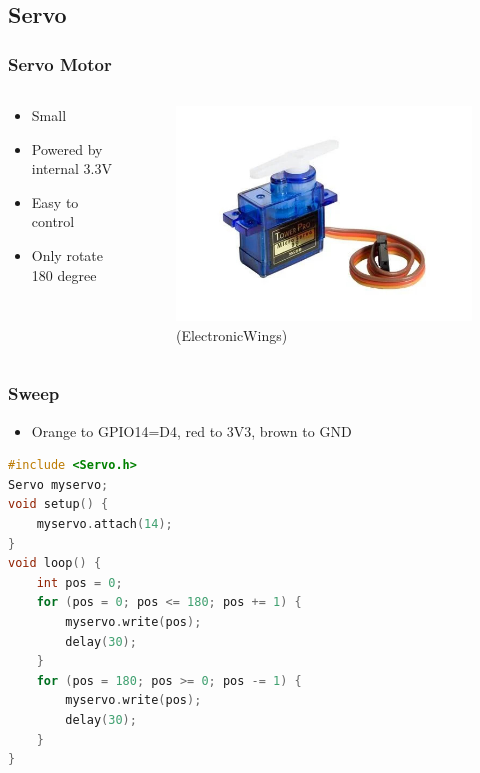 \documentclass[compress, aspectratio=32]{beamer}
\begin{document}
\subsection{Servo}
\begin{frame}
    \frametitle{Servo Motor}
    \begin{columns}
        \begin{column}[]{0.5\textwidth}
            \begin{itemize}
                \item Small
                \item Powered by internal 3.3V
                \item Easy to control
                \item Only rotate 180 degree
            \end{itemize}
        \end{column}
        \begin{column}[]{0.5\textwidth}
            \begin{figure}
                \centering
                \includegraphics[width=\textwidth]{servo.jpg}
                \caption*{(ElectronicWings)}
            \end{figure}
        \end{column}
    \end{columns}
\end{frame}
\begin{frame}[fragile]
    \frametitle{Sweep}
    \begin{itemize}
        \item Orange to GPIO14=D4, red to 3V3, brown to GND
    \end{itemize}
    \begin{lstlisting}[language=c]
#include <Servo.h>
Servo myservo;
void setup() {
    myservo.attach(14);
}
void loop() {
    int pos = 0;
    for (pos = 0; pos <= 180; pos += 1) {  
        myservo.write(pos);  
        delay(30);           
    }
    for (pos = 180; pos >= 0; pos -= 1) {  
        myservo.write(pos);                  
        delay(30);
    }
}
    \end{lstlisting}
\end{frame}
\end{document}
